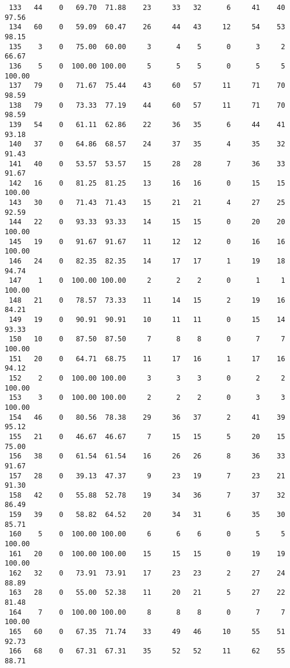 \begin{verbatim}
 133   44    0   69.70  71.88    23     33   32      6     41    40    97.56
 134   60    0   59.09  60.47    26     44   43     12     54    53    98.15
 135    3    0   75.00  60.00     3      4    5      0      3     2    66.67
 136    5    0  100.00 100.00     5      5    5      0      5     5   100.00
 137   79    0   71.67  75.44    43     60   57     11     71    70    98.59
 138   79    0   73.33  77.19    44     60   57     11     71    70    98.59
 139   54    0   61.11  62.86    22     36   35      6     44    41    93.18
 140   37    0   64.86  68.57    24     37   35      4     35    32    91.43
 141   40    0   53.57  53.57    15     28   28      7     36    33    91.67
 142   16    0   81.25  81.25    13     16   16      0     15    15   100.00
 143   30    0   71.43  71.43    15     21   21      4     27    25    92.59
 144   22    0   93.33  93.33    14     15   15      0     20    20   100.00
 145   19    0   91.67  91.67    11     12   12      0     16    16   100.00
 146   24    0   82.35  82.35    14     17   17      1     19    18    94.74
 147    1    0  100.00 100.00     2      2    2      0      1     1   100.00
 148   21    0   78.57  73.33    11     14   15      2     19    16    84.21
 149   19    0   90.91  90.91    10     11   11      0     15    14    93.33
 150   10    0   87.50  87.50     7      8    8      0      7     7   100.00
 151   20    0   64.71  68.75    11     17   16      1     17    16    94.12
 152    2    0  100.00 100.00     3      3    3      0      2     2   100.00
 153    3    0  100.00 100.00     2      2    2      0      3     3   100.00
 154   46    0   80.56  78.38    29     36   37      2     41    39    95.12
 155   21    0   46.67  46.67     7     15   15      5     20    15    75.00
 156   38    0   61.54  61.54    16     26   26      8     36    33    91.67
 157   28    0   39.13  47.37     9     23   19      7     23    21    91.30
 158   42    0   55.88  52.78    19     34   36      7     37    32    86.49
 159   39    0   58.82  64.52    20     34   31      6     35    30    85.71
 160    5    0  100.00 100.00     6      6    6      0      5     5   100.00
 161   20    0  100.00 100.00    15     15   15      0     19    19   100.00
 162   32    0   73.91  73.91    17     23   23      2     27    24    88.89
 163   28    0   55.00  52.38    11     20   21      5     27    22    81.48
 164    7    0  100.00 100.00     8      8    8      0      7     7   100.00
 165   60    0   67.35  71.74    33     49   46     10     55    51    92.73
 166   68    0   67.31  67.31    35     52   52     11     62    55    88.71

\end{verbatim}
